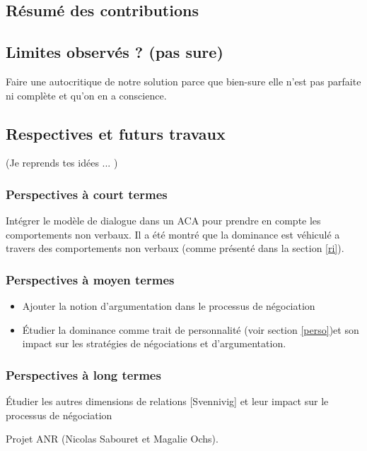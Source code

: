 \documentclass [french]{article}
\begin{document}
		\subsection{Résumé des contributions}
		
		\subsection{Limites observés ? (pas sure)}
			Faire une autocritique de notre solution parce que bien-sure elle n'est pas parfaite ni complète et qu'on en a conscience. 
		
		\subsection{Respectives et futurs travaux}
			(Je reprends tes idées ... )
			\subsubsection{Perspectives à court termes}
				Intégrer le modèle de dialogue dans un ACA pour prendre en compte les comportements non verbaux. Il a été montré que la dominance est véhiculé a travers des comportements non verbaux (comme présenté dans la section \ref{ri}).
			
			\subsubsection{Perspectives à moyen termes}
			\begin{itemize}
				\item	Ajouter la notion d'argumentation dans le processus de négociation
				\item	Étudier la dominance comme trait de personnalité (voir section \ref{perso})et son impact sur les stratégies de négociations et d'argumentation.

			\end{itemize}

			\subsubsection{Perspectives à long termes}
				Étudier les autres dimensions de relations [Svennivig] et leur impact sur le processus de négociation
				
				Projet ANR (Nicolas Sabouret et Magalie Ochs).
\end{document}
